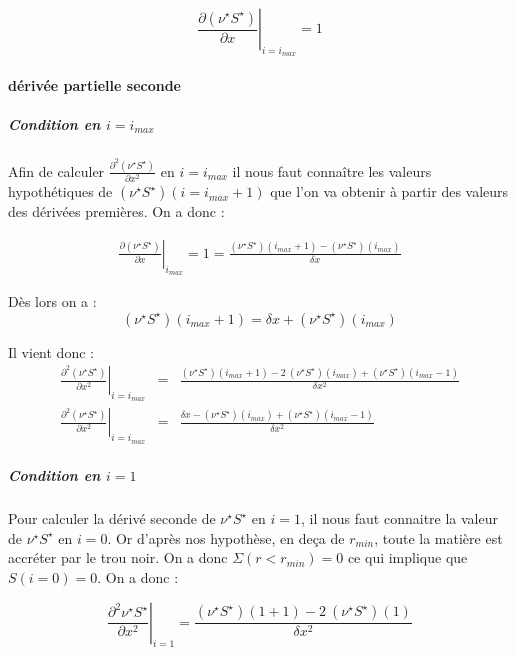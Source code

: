 \begin{equation}
  \label{eq:nuS_n_is_null}
  \left. \frac{\partial (\nu^{\star} S^{\star})}{\partial x}\right|_{i=i_{max}}=1
\end{equation}


\paragraph{dérivée partielle seconde}

\subparagraph{Condition en $i=i_{max}$}
Afin de calculer $\frac{\partial^2(\nu^{\star} S^{\star})} {\partial x^2}$ en $i=i_{max}$ il nous faut connaître les valeurs hypothétiques de $(\nu^{\star} S^{\star})(i=i_{max}+1)$ que l'on va obtenir à partir des valeurs des dérivées premières. On a donc :

\begin{eqnarray}
  \left. \frac{\partial (\nu^{\star}S^{\star})}{\partial x} \right|_{i_{max}} = 1 = \frac{(\nu^{\star} S^{\star})(i_{max}+1)-(\nu^{\star}S^{\star})(i_{max})}{\delta x} 
\end{eqnarray}

Dès lors on a : 
\begin{equation}
( \nu^{\star} S^{\star})(i_{max}+1) = \delta x + (\nu^{\star}S^{\star})(i_{max}) 
\end{equation}

Il vient donc :
\begin{eqnarray}
 \left. \frac{\partial^2 (\nu^{\star} S^{\star})}{\partial x^2}\right|_{i=i_{max}} &=& \frac{(\nu^{\star} S^{\star})(i_{max}+1) - 2\ (\nu^{\star} S^{\star})(i_{max}) + (\nu^{\star} S^{\star})(i_{max}-1)}{\delta x^2}\\
 \left. \frac{\partial^2 (\nu^{\star} S^{\star})}{\partial x^2}\right|_{i=i_{max}} &=& \frac{\delta x - (\nu^{\star} S^{\star})(i_{max}) + (\nu^{\star} S^{\star})(i_{max}-1)}{\delta x^2}
\end{eqnarray}

\subparagraph{Condition en $i=1$}
Pour calculer la dérivé seconde de $\nu^{\star} S^{\star}$ en $i=1$, il nous faut connaitre la valeur de $\nu^{\star} S^{\star}$ en $i=0$. Or d'après nos hypothèse, en deça de $r_{min}$, toute la matière est accréter par le trou noir. On a donc $\Sigma(r<r_{min})=0$ ce qui implique que $S(i=0)=0$. On a donc :

\begin{equation}
  \left. \frac{\partial^2 \nu^{\star}S^{\star}}{\partial x^2}\right|_{i=1}=\frac{(\nu^{\star}S^{\star})(1+1)-2\ (\nu^{\star}S^{\star})(1)}{\delta x^2} 
\end{equation}


